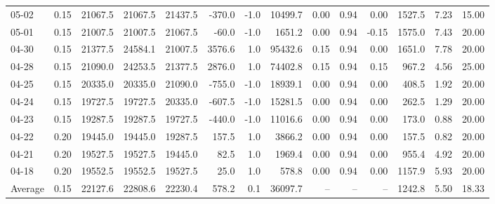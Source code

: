 \begin{threeparttable}
{\begin{tabular}{lrrrrrrrrrrrrr}
  05-02 &     0.15 & 21067.5 & 21067.5 & 21437.5 &     -370.0 &                     -1.0 &             10499.7 &       0.00 &      0.94 &           0.00 &           1527.5 &            7.23 &                  15.00 \\
  05-01 &     0.15 & 21007.5 & 21007.5 & 21067.5 &      -60.0 &                     -1.0 &              1651.2 &       0.00 &      0.94 &          -0.15 &           1575.0 &            7.43 &                  20.00 \\
  04-30 &     0.15 & 21377.5 & 24584.1 & 21007.5 &     3576.6 &                      1.0 &             95432.6 &       0.15 &      0.94 &           0.00 &           1651.0 &            7.78 &                  20.00 \\
  04-28 &     0.15 & 21090.0 & 24253.5 & 21377.5 &     2876.0 &                      1.0 &             74402.8 &       0.15 &      0.94 &           0.15 &            967.2 &            4.56 &                  25.00 \\
  04-25 &     0.15 & 20335.0 & 20335.0 & 21090.0 &     -755.0 &                     -1.0 &             18939.1 &       0.00 &      0.94 &           0.00 &            408.5 &            1.92 &                  20.00 \\
  04-24 &     0.15 & 19727.5 & 19727.5 & 20335.0 &     -607.5 &                     -1.0 &             15281.5 &       0.00 &      0.94 &           0.00 &            262.5 &            1.29 &                  20.00 \\
  04-23 &     0.15 & 19287.5 & 19287.5 & 19727.5 &     -440.0 &                     -1.0 &             11016.6 &       0.00 &      0.94 &           0.00 &            173.0 &            0.88 &                  20.00 \\
  04-22 &     0.20 & 19445.0 & 19445.0 & 19287.5 &      157.5 &                      1.0 &              3866.2 &       0.00 &      0.94 &           0.00 &            157.5 &            0.82 &                  20.00 \\
  04-21 &     0.20 & 19527.5 & 19527.5 & 19445.0 &       82.5 &                      1.0 &              1969.4 &       0.00 &      0.94 &           0.00 &            955.4 &            4.92 &                  20.00 \\
  04-18 &     0.20 & 19552.5 & 19552.5 & 19527.5 &       25.0 &                      1.0 &               578.8 &       0.00 &      0.94 &           0.00 &           1157.9 &            5.93 &                  20.00 \\
Average &     0.15 & 22127.6 & 22808.6 & 22230.4 &      578.2 &                      0.1 &             36097.7 &         -- &        -- &             -- &           1242.8 &            5.50 &                  18.33 \\

\end{tabular}}
\end{threeparttable}
